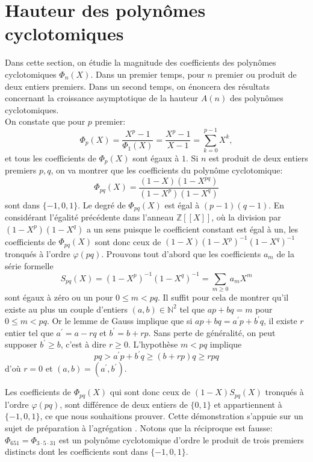 \documentclass{article}
\newcounter{lemme}
\theoremstyle{break}                  %
\begin{document}
\section*{Hauteur des polynômes cyclotomiques}\label{sec:hauteur}
Dans cette section, on étudie la magnitude des coefficients des polynômes cyclotomiques $\Phi_n(X)$. Dans un premier temps, pour $n$ premier ou produit de deux entiers premiers. Dans un second temps, on énoncera des résultats concernant la croissance asymptotique de la hauteur $A(n)$ des polynômes cyclotomiques.\\


On constate que pour $p$ premier:
$$\Phi_p(X) = \frac{X^p-1}{\Phi_1(X)} = \frac{X^p-1}{X-1} = \sum_{k=0}^{p-1} X^k,$$
et tous les coefficients de $\Phi_p(X)$ sont égaux à $1$. Si $n$ est produit de deux entiers premiers $p,q$, on va montrer que les coefficients du polynôme cyclotomique:
$$\Phi_{pq}(X) = \frac{(1-X)(1-X^{pq})}{(1-X^p)(1-X^q)}$$ sont dans $\{-1, 0, 1\}$. Le degré de $\Phi_{pq}(X)$ est égal à $(p-1)(q-1)$. En considérant l'égalité précédente dans l'anneau $\mathbb Z[[X]]$, où la division par $(1-X^p)(1-X^q)$ a un sens puisque le coefficient constant est égal à un, les coefficients de $\Phi_{pq}(X)$ sont donc ceux de $(1-X)(1-X^p)^{-1}(1-X^q)^{-1}$ tronqués à l'ordre $\varphi(pq)$. Prouvons tout d'abord que les coefficients $a_m$ de la série formelle
$$S_{pq}(X) = (1-X^p)^{-1}(1-X^q)^{-1} = \sum_{m \ge 0} a_m X^m$$ sont égaux à zéro ou un pour $0 \le m < pq$. Il suffit pour cela de montrer qu'il existe au plus un couple d'entiers $(a,b) \in \mathbb N^2$ tel que $ap+bq = m$ pour $0 \le m < pq$. Or le lemme de Gauss implique que si $ap+bq = a^\prime p + b^\prime q$, il existe $r$ entier tel que $a^\prime = a -rq$ et $b^\prime = b +rp$. Sans perte de généralité, on peut supposer $b^\prime \ge b$, c'est à dire $r \ge 0$. L'hypothèse $m <pq$ implique
$$pq > a^\prime p + b^\prime q \ge (b + r p)q \ge rpq$$ d'où $r=0$ et $(a,b)=(a^\prime, b^\prime)$.

Les coefficients de $\Phi_{pq}(X)$ qui sont donc ceux de $(1-X) S_{pq}(X)$ tronqués à l'ordre $\varphi(pq)$, sont différence de deux entiers de $\{0,1\}$ et appartiennent à $\{-1,0,1\}$, ce que nous souhaitions prouver. Cette démonstration s'appuie sur un sujet de préparation à l'agrégation \cite{agreg}.  Notons que la réciproque est fausse: $\Phi_{651} = \Phi_{3 \cdot 5 \cdot 31}$ est un polynôme cyclotomique d'ordre le produit de trois premiers distincts dont les coefficients sont dans $\{-1,0,1\}$.\\
\end{document}
